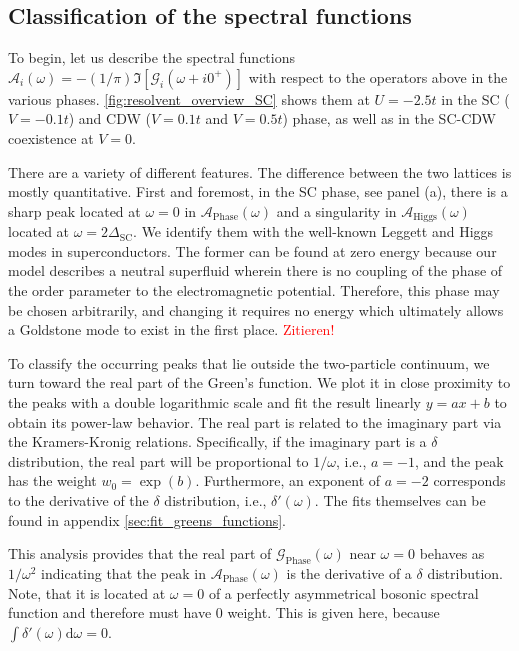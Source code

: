 \documentclass[
    reprint, 
    aps,
    preprintnumbers,
    twocolumn,
    prb,
    superscriptaddress
]{revtex4-2}
\newcommand{\greens}[1]{\mathcal{G}_\text{#1} (\omega)}
\newcommand{\spectral}[1]{\mathcal{A}_\text{#1}  (\omega)}
\begin{document}
\subsection{Classification of the spectral functions}

To begin, let us describe the spectral functions $\mathcal{A}_i (\omega) = - (1/\pi) \Im [\mathcal{G}_i (\omega + i0^+)]$ with respect to the operators above in the various phases.
\autoref{fig:resolvent_overview_SC} shows them at $U = -2.5t$ in the SC ($V=-0.1t$) and CDW ($V=0.1t$ and $V=0.5t$) phase, as well as in the SC-CDW coexistence at $V=0$.

There are a variety of different features. The difference between the two lattices is mostly quantitative.
First and foremost, in the SC phase, see panel (a), there is a sharp peak located at $\omega=0$ in $\spectral{Phase}$ and a singularity in $\spectral{Higgs}$ located at $\omega=2\Delta_\text{SC}$.
We identify them with the well-known Leggett and Higgs modes in superconductors.
The former can be found at zero energy because our model describes a neutral superfluid wherein there is no coupling of the phase of the order parameter to the electromagnetic potential.
Therefore, this phase may be chosen arbitrarily, and changing it requires no energy which ultimately allows a Goldstone mode to exist in the first place. \textcolor{red}{Zitieren!}

To classify the occurring peaks that lie outside the two-particle continuum, we turn toward the real part of the Green's function.
We plot it in close proximity to the peaks with a double logarithmic scale and fit the result linearly $y = ax + b$ to obtain its power-law behavior.
The real part is related to the imaginary part via the Kramers-Kronig relations.
Specifically, if the imaginary part is a $\delta$ distribution, the real part will be proportional to $1/\omega$, i.e., $a=-1$, and the peak has the weight $w_0 = \exp(b)$.
Furthermore, an exponent of $a=-2$ corresponds to the derivative of the $\delta$ distribution, i.e., $\delta'(\omega)$.
The fits themselves can be found in appendix \autoref{sec:fit_greens_functions}.

This analysis provides that the real part of $\greens{Phase}$ near $\omega=0$ behaves as $1/\omega^2$ indicating that the peak in $\spectral{Phase}$ is the derivative of a $\delta$ distribution.
Note, that it is located at $\omega=0$ of a perfectly asymmetrical bosonic spectral function and therefore must have 0 weight.
This is given here, because $\int \delta'(\omega) \mathrm{d}\omega = 0$.
\end{document}
